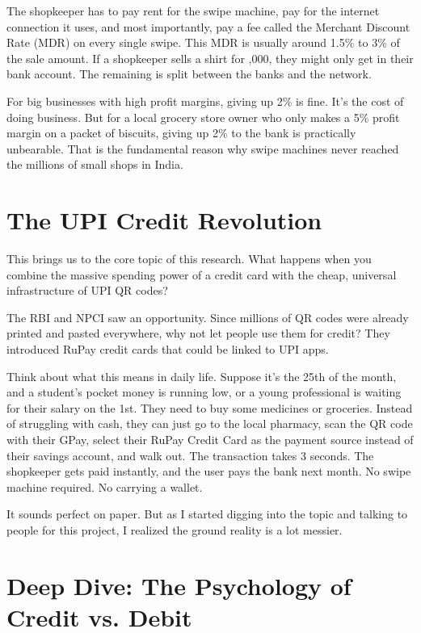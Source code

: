 The shopkeeper has to pay rent for the swipe machine, pay for the internet connection it uses, and most importantly, pay a fee called the Merchant Discount Rate (MDR) on every single swipe. This MDR is usually around 1.5\% to 3\% of the sale amount. If a shopkeeper sells a shirt for ,000, they might only get  in their bank account. The remaining  is split between the banks and the network.

For big businesses with high profit margins, giving up 2\% is fine. It's the cost of doing business. But for a local grocery store owner who only makes a 5\% profit margin on a packet of biscuits, giving up 2\% to the bank is practically unbearable. That is the fundamental reason why swipe machines never reached the millions of small shops in India.

\section{The UPI Credit Revolution}

This brings us to the core topic of this research. What happens when you combine the massive spending power of a credit card with the cheap, universal infrastructure of UPI QR codes?

The RBI and NPCI saw an opportunity. Since millions of QR codes were already printed and pasted everywhere, why not let people use them for credit? They introduced RuPay credit cards that could be linked to UPI apps.

Think about what this means in daily life. Suppose it's the 25th of the month, and a student's pocket money is running low, or a young professional is waiting for their salary on the 1st. They need to buy some medicines or groceries. Instead of struggling with cash, they can just go to the local pharmacy, scan the QR code with their GPay, select their RuPay Credit Card as the payment source instead of their savings account, and walk out. The transaction takes 3 seconds. The shopkeeper gets paid instantly, and the user pays the bank next month. No swipe machine required. No carrying a wallet.

It sounds perfect on paper. But as I started digging into the topic and talking to people for this project, I realized the ground reality is a lot messier.

\section{Deep Dive: The Psychology of Credit vs. Debit}

